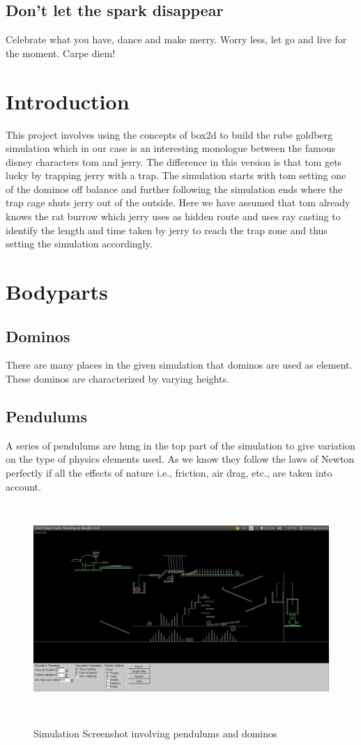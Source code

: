 \documentclass{article}
\begin{document}
\subsection{Don't let the spark disappear}
Celebrate what you have, dance and make merry. Worry less, let go and live for the moment. Carpe diem!

\section{Introduction} \label{Introduction}
    This project involves using the concepts of box2d to build the rube goldberg simulation which in our case is an interesting monologue between the famous disney characters tom and jerry. The difference in this version is that tom gets lucky by trapping jerry with a trap. The simulation starts with tom setting one of the dominos off balance and further following the simulation ends where the trap cage shuts jerry out of the outside. Here we have assumed that tom already knows the rat burrow which jerry uses as hidden route and uses ray casting to identify the length and time taken by jerry to reach the trap zone and thus setting the simulation accordingly.

\section{Bodyparts} \label{body}
    \subsection{Dominos}
        There are many places in the given simulation that dominos are used as element. These dominos are characterized by varying heights.
    \subsection{Pendulums}
        A series of pendulums are hung in the top part of the simulation to give variation on the type of physics elements used. As we know they follow the laws of Newton \cite{newton} perfectly if all the effects of nature i.e., friction, air drag, etc., are taken into account.
    \begin{figure}[h] 
    \caption{Simulation Screenshot involving pendulums and dominos}
    \begin{center}
    \includegraphics[height=8cm,scale=0.30]{Middle}
    \label{Intermediate simulation}
    \end{center}
    \end{figure}
\end{document}
